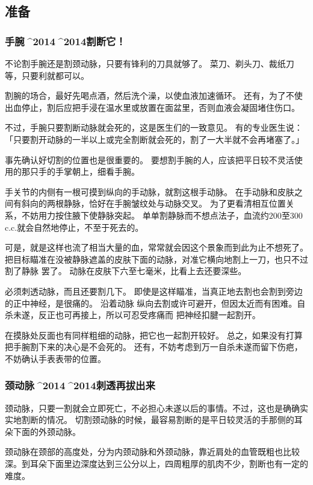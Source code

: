 \documentclass[UTF8]{ctexart}
\begin{document}
\subsection{准备}

\subsubsection{手腕^^^^2014^^^^2014割断它！}

不论割手腕还是割颈动脉，只要有锋利的刀具就够了。
菜刀、剃头刀、裁纸刀等，只要利就都可以。

割腕的场合，最好先喝点酒，然后洗个澡，以使血液加速循环。
还有，为了不使出血停止，割后应把手浸在温水里或放置在面盆里，否则血液会凝固堵住伤口。

不过，手腕只要割断动脉就会死的，这是医生们的一致意见。
有的专业医生说：「只要割开动脉的一半以上或完全割断就会死的，割了一大半就不会再堵塞了。」

事先确认好切割的位置也是很重要的。
要想割手腕的人，应该把平日较不灵活使用的那只手的手掌朝上，细看手腕。

手关节的内侧有一根可摸到纵向的手动脉，就割这根手动脉。
在手动脉和皮肤之间有斜向的两根静脉，恰好在手腕皱纹处与动脉交叉。
为了更看清相互位置关系，不妨用力按住腋下使静脉突起。
单单割静脉而不想点法子，血流约$200$至$300$c.c.就会自然地停止，不至于死去的。

可是，就是这样也流了相当大量的血，常常就会因这个景象而到此为止不想死了。
把目标瞄准在没被静脉遮盖的皮肤下面的动脉，对准它横向地割上一刀，也只不过割了静脉 罢了。
动脉在皮肤下六至七毫米，比看上去还要深些。

必须刺透动脉，而且还要割几下。
即使是这样瞄准，当真正地去割也会割到旁边的正中神经，是很痛的。
沿着动脉 纵向去割或许可避开，但因太近而有困难。自杀未遂，反正也可再接上，所以可忍受疼痛而 把神经扣腱一起割开。

在摸脉处反面也有同样粗细的动脉，把它也一起割开较好。
总之，如果没有打算把手腕割下来的决心是不会死的。 
还有，不妨考虑到万一自杀未遂而留下伤疤，不妨确认手表表带的位置。

\subsubsection{颈动脉^^^^2014^^^^2014刺透再拔出来}

颈动脉，只要一割就会立即死亡，不必担心未遂以后的事情。不过，这也是确确实实地割断的情况。
切割颈动脉的时候，最容易割断的是平日较灵活的手那侧的耳朵下面的外颈动脉。

颈动脉在颈部的高度处，分为内颈动脉和外颈动脉，靠近肩处的血管既粗也比较深。到耳朵下面里边深度达到三公分以上，四周粗厚的肌肉不少，割断也有一定的难度。
\end{document}
